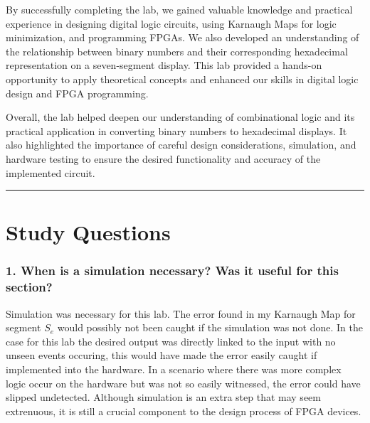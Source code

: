 \documentclass{article}
\begin{document}
By successfully completing the lab, we gained valuable knowledge and practical experience in designing digital logic circuits, using Karnaugh Maps for logic minimization, and programming FPGAs. We also developed an understanding of the relationship between binary numbers and their corresponding hexadecimal representation on a seven-segment display. This lab provided a hands-on opportunity to apply theoretical concepts and enhanced our skills in digital logic design and FPGA programming.

Overall, the lab helped deepen our understanding of combinational logic and its practical application in converting binary numbers to hexadecimal displays. It also highlighted the importance of careful design considerations, simulation, and hardware testing to ensure the desired functionality and accuracy of the implemented circuit.
\vspace{5mm}
\hrule

\section*{\textcolor{mycolor}{Study Questions}}
\subsubsection*{\textcolor{mycolor}{1. When is a simulation necessary? Was it useful for this section?}}
Simulation was necessary for this lab. The error found in my Karnaugh Map for segment $S_e$ would possibly not been caught if the simulation was not done. In the case for this lab the desired output was directly linked to the input with no unseen events occuring, this would have made the error easily caught if implemented into the hardware. In a scenario where there was more complex logic occur on the hardware but was not so easily witnessed, the error could have slipped undetected. Although simulation is an extra step that may seem extrenuous, it is still a crucial component to the design process of FPGA devices.
\end{document}
